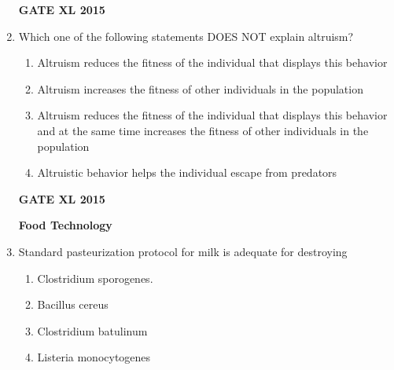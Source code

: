 \documentclass[journal,12pt,onecolumn]{IEEEtran}
\begin{document}
\begin{enumerate}
\hfill{\textbf{GATE XL 2015}}
\item Which one of the following statements DOES NOT explain altruism?
    \begin{enumerate}
            \item Altruism reduces the fitness of the individual that displays this behavior
	    \item Altruism increases the fitness of other individuals in the population
	    \item Altruism reduces the fitness of the individual that displays this behavior and at the same time
increases the fitness of other individuals in the population
            \item  Altruistic behavior helps the individual escape from predators
    \end{enumerate}


\hfill{\textbf{GATE XL 2015}}
	

	\textbf{Food Technology}
\item Standard pasteurization protocol for milk is adequate for destroying
    \begin{enumerate}
            \item Clostridium sporogenes.
	    \item Bacillus cereus
	    \item Clostridium batulinum
            \item Listeria monocytogenes
    \end{enumerate}



\end{enumerate}
\end{document}
